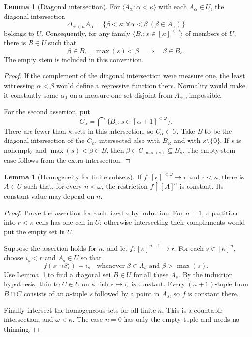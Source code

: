 \documentclass[11pt,letterpaper]{article}
\theoremstyle{definition}
\newtheorem{lemma}[definition]{Lemma}
\numberwithin{equation}{section}
\newcommand{\restr}{\mathbin{\upharpoonright}}
\begin{document}
\begin{lemma}[Diagonal intersection]\label{lem:diag}
For $\langle A_\alpha:\alpha<\kappa\rangle$ with each $A_\alpha\in U$, the diagonal intersection
\[
 \Delta_{\alpha<\kappa}A_\alpha
   =\{\beta<\kappa:\forall\alpha<\beta\ (\beta\in A_\alpha)\}
\]
belongs to $U$. Consequently, for any family $\langle B_s:s\in[\kappa]^{<\omega}\rangle$ of members of $U$, there is $B\in U$ such that
\begin{equation}\label{eq:stemdiag}
 \beta\in B,\quad \max(s)<\beta
 \quad\Longrightarrow\quad \beta\in B_s.
\end{equation}
The empty stem is included in this convention.
\end{lemma}
\begin{proof}
If the complement of the diagonal intersection were measure one, the least witnessing $\alpha<\beta$ would define a regressive function there. Normality would make it constantly some $\alpha_0$ on a measure-one set disjoint from $A_{\alpha_0}$, impossible.

For the second assertion, put
\[
 C_\alpha=\bigcap\{B_s:s\in[\alpha+1]^{<\omega}\}.
\]
There are fewer than $\kappa$ sets in this intersection, so $C_\alpha\in U$. Take $B$ to be the diagonal intersection of the $C_\alpha$, intersected also with $B_\varnothing$ and with $\kappa\setminus\{0\}$. If $s$ is nonempty and $\max(s)<\beta\in B$, then $\beta\in C_{\max(s)}\subseteq B_s$. The empty-stem case follows from the extra intersection.
\end{proof}

\begin{lemma}[Homogeneity for finite subsets]\label{lem:ramsey}
If $f:[\kappa]^{<\omega}\to r$ and $r<\kappa$, there is $A\in U$ such that, for every $n<\omega$, the restriction $f\restr[A]^n$ is constant. Its constant value may depend on $n$.
\end{lemma}
\begin{proof}
Prove the assertion for each fixed $n$ by induction. For $n=1$, a partition into $r<\kappa$ cells has one cell in $U$; otherwise intersecting their complements would put the empty set in $U$.

Suppose the assertion holds for $n$, and let $f:[\kappa]^{n+1}\to r$. For each $s\in[\kappa]^n$, choose $i_s<r$ and $A_s\in U$ so that
\[
 f(s^\frown\langle\beta\rangle)=i_s
 \quad\text{whenever }\beta\in A_s\text{ and }\beta>\max(s).
\]
Use Lemma~\ref{lem:diag} to find a diagonal set $B\in U$ for all these $A_s$. By the induction hypothesis, thin to $C\in U$ on which $s\mapsto i_s$ is constant. Every $(n+1)$-tuple from $B\cap C$ consists of an $n$-tuple $s$ followed by a point in $A_s$, so $f$ is constant there.

Finally intersect the homogeneous sets for all finite $n$. This is a countable intersection, and $\omega<\kappa$. The case $n=0$ has only the empty tuple and needs no thinning.
\end{proof}
\end{document}
